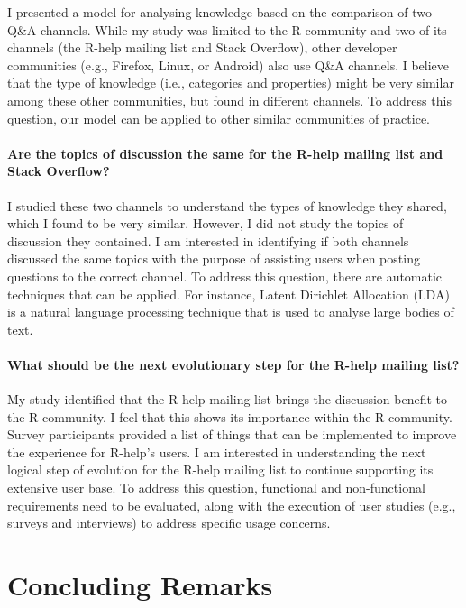 \documentclass{sig-alternate-05-2015}
\begin{document}
	I presented a model for analysing knowledge based on the comparison of two Q\&A channels. 
	While my study was limited to the R community and two of its channels (the R-help mailing list and Stack Overflow), 
	other developer communities (e.g., Firefox, Linux, or Android) also use Q\&A channels.
	I believe that the type of knowledge (i.e., categories and properties) might be very similar among these other communities, but found in different channels.
	To address this question, our model can be applied to other similar communities of practice.

	\paragraph{Are the topics of discussion the same for the R-help mailing list and Stack Overflow?}

	I studied these two channels to understand the types of knowledge they shared, which I found to be very similar. 
	However, I did not study the topics of discussion they contained.
	I am interested in identifying if both channels discussed the same topics with the purpose of assisting users when posting questions to the correct channel. 
	To address this question, there are automatic techniques that can be applied. For instance, Latent Dirichlet Allocation (LDA)~\cite{Blei2002} is a natural language processing technique that is used to analyse large bodies of text.

	\paragraph{What should be the next evolutionary step for the R-help mailing list?}

	My study identified that the R-help mailing list brings the discussion benefit to the R community. 
	I feel that this shows its importance within the R community.
	Survey participants provided a list of things that can be implemented to improve the experience for R-help's users.
	I am interested in understanding the next logical step of evolution for the R-help mailing list to continue supporting its extensive user base.
	To address this question, functional and non-functional requirements need to be evaluated, along with the execution of user studies (e.g., surveys and interviews) to address specific usage concerns.


\section{Concluding Remarks}
\label{cha:conclusion}
\end{document}
